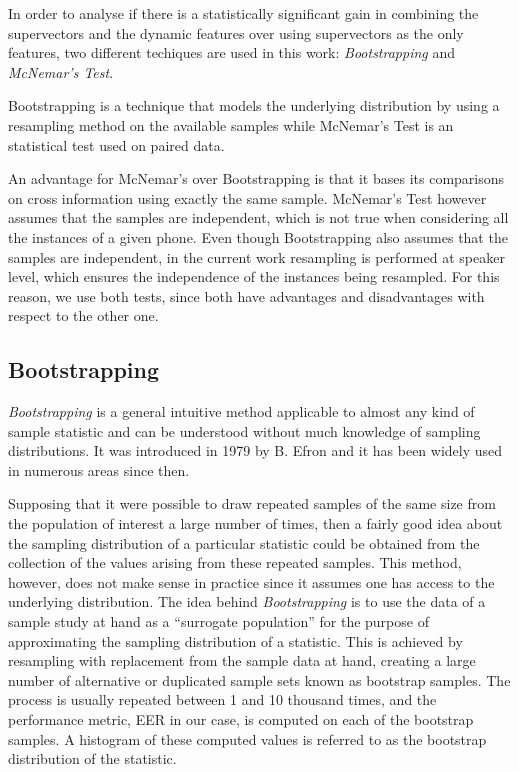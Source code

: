 In order to analyse if
there is a statistically significant gain in combining the
supervectors and the dynamic features
over using supervectors as the only features,
two different techiques are used in this work: \textit{Bootstrapping} and
\textit{McNemar's Test}.

Bootstrapping is a technique that models the underlying
distribution by using a resampling method on the available samples while McNemar's
Test is an statistical test used on paired data.

An advantage for McNemar's
over Bootstrapping is that it bases its comparisons on cross information using
exactly the same sample.
McNemar's Test however assumes that the samples
are independent, which is not true when considering
all the instances of a given phone. Even though Bootstrapping also assumes that
the samples are independent, in the current work resampling is performed
at speaker level, which ensures the independence of the instances being resampled.
For this reason, we use both tests, since both have advantages and
disadvantages with respect to the other one.

\subsection{Bootstrapping} \label{subsection:bootstrapping}

\textit{Bootstrapping} \cite{bootstrapping} is a general intuitive method applicable
to almost any kind of sample statistic and can be understood without much
knowledge of sampling distributions. It was introduced in 1979 by B. Efron and it has
been widely used in numerous areas since then.

Supposing that it were possible to draw repeated samples
of the same size from the population of interest a large number of times, then
a fairly good idea about the sampling distribution
of a particular statistic could be obtained from the collection of the
values arising from these repeated samples.
This method, however, does not make sense in practice since it assumes one has access to the
underlying distribution.
The idea behind \textit{Bootstrapping} is to use the data of a sample study at hand as a
``surrogate population'' for the purpose of approximating the sampling distribution of
a statistic. This is achieved by resampling with replacement from the sample data
at hand, creating a large number of alternative or duplicated sample sets known as
bootstrap samples. The process is usually repeated between 1 and 10 thousand
times, and the performance metric, EER in our case,
is computed on each of the bootstrap
samples.
A histogram of these computed
values is referred to as the bootstrap distribution of the statistic.


